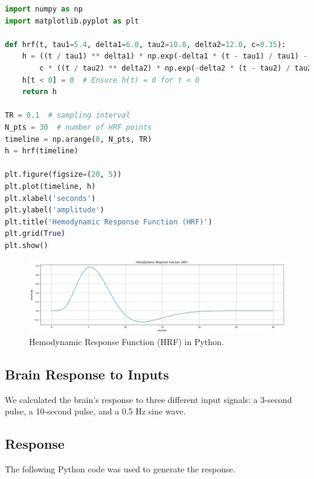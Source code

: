 \documentclass[10pt]{article}
\theoremstyle{definition}
\theoremstyle{remark}
\theoremstyle{definition}
\numberwithin{equation}{prob}
\begin{document}
\begin{lstlisting}[language=Python]
import numpy as np
import matplotlib.pyplot as plt

def hrf(t, tau1=5.4, delta1=6.0, tau2=10.8, delta2=12.0, c=0.35):
    h = ((t / tau1) ** delta1) * np.exp(-delta1 * (t - tau1) / tau1) - \
        c * ((t / tau2) ** delta2) * np.exp(-delta2 * (t - tau2) / tau2)
    h[t < 0] = 0  # Ensure h(t) = 0 for t < 0
    return h

TR = 0.1  # sampling interval
N_pts = 30  # number of HRF points
timeline = np.arange(0, N_pts, TR)
h = hrf(timeline)

plt.figure(figsize=(20, 5))
plt.plot(timeline, h)
plt.xlabel('seconds')
plt.ylabel('amplitude')
plt.title('Hemodynamic Response Function (HRF)')
plt.grid(True)
plt.show()
\end{lstlisting}

\begin{figure}[H]
    \centering
    \includegraphics[width=0.8\linewidth]{./figures/Hemodynamic Response Function (HRF).png}
    \caption{Hemodynamic Response Function (HRF) in Python.}
\end{figure}

\subsection{Brain Response to Inputs}

We calculated the brain’s response to three different input signals: a 3-second pulse, a 10-second pulse, and a 0.5 Hz sine wave.

\subsection*{Response}
The following Python code was used to generate the response.
\end{document}
